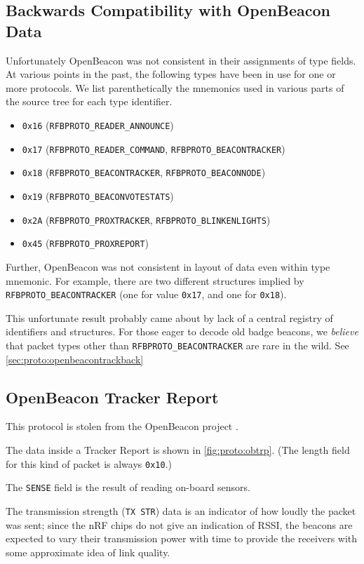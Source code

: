 \subsection{Backwards Compatibility with OpenBeacon Data}

Unfortunately OpenBeacon was not consistent
in their assignments of type fields.
At various points in the past,
the following types have been in use
for one or more protocols.
We list parenthetically the mnemonics
used in various parts of the source tree
for each type identifier.
\begin{itemize}
    \item {\tt 0x16} ({\tt RFBPROTO\_READER\_ANNOUNCE})
    \item {\tt 0x17} ({\tt RFBPROTO\_READER\_COMMAND}, {\tt RFBPROTO\_BEACONTRACKER})
    \item {\tt 0x18} ({\tt RFBPROTO\_BEACONTRACKER}, {\tt RFBPROTO\_BEACONNODE})
    \item {\tt 0x19} ({\tt RFBPROTO\_BEACONVOTESTATS})
    \item {\tt 0x2A} ({\tt RFBPROTO\_PROXTRACKER}, {\tt RFBPROTO\_BLINKENLIGHTS})
    \item {\tt 0x45} ({\tt RFBPROTO\_PROXREPORT})
\end{itemize}
Further, OpenBeacon was not consistent in layout of data
even within type mnemonic.
For example, there are two different
structures implied by {\tt RFBPROTO\_BEACONTRACKER}
(one for value {\tt 0x17}, and one for {\tt 0x18}).

This unfortunate result probably came about by lack of
a central registry of identifiers and structures.
For those eager to decode old badge beacons,
we {\em believe} that
packet types other than {\tt RFBPROTO\_BEACONTRACKER}
are rare in the wild.
See \autoref{sec:proto:openbeacontrackback}

\subsection{OpenBeacon Tracker Report}
\label{sec:proto:openbeacon}

This protocol is stolen from the OpenBeacon project \cite{openbeacon}.

The data inside a Tracker Report is shown in \autoref{fig:proto:obtrp}.
(The length field for this kind of packet is always {\tt 0x10}.)

The {\tt SENSE} field is the result of reading on-board sensors.

The transmission strength ({\tt TX STR}) data is
an indicator of how loudly the packet was sent;
since the nRF chips do not
give an indication of RSSI,
the beacons are expected
to vary their transmission power with time
to provide the receivers
with some approximate idea
of link quality.


